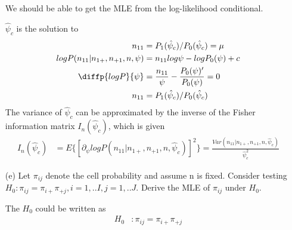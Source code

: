 \documentclass[11pt]{article} %
\begin{document}
\begin{itemize}
We should be able to get the MLE from the log-likelihood conditional.

$\hat{\psi}_c$ is the solution to 
\begin{align*}
	n_{11} &= P_1(\hat{\psi}_c)/P_0(\hat{\psi}_c) = \mu\\
	log P(n_{11}| n_{1+}, n_{+1}, n, \psi) &=  n_{11} log \psi - log P_0(\psi) + c\\
	\diffp{log P}{\psi} &= \frac{n_{11}}{\psi} -\frac{P_0(\psi)'}{P_0(\psi)} = 0\\
	n_{11} &= P_1(\hat{\psi}_c)/P_0(\hat{\psi}_c)
\end{align*}
The variance of $\hat{\psi}_c$ can be approximated by the inverse of the Fisher information matrix $I_n(\hat{\psi}_c)$, which is given
\begin{align*}
	I_n(\hat{\psi}_c) &= E\{[ \partial_{\psi} log P(n_{11}| n_{1+}, n_{+1}, n, \hat{\psi}_c)]^2 \} = \frac{Var(n_{11}| n_{1+}, n_{+1}, n, \hat{\psi}_c)}{\hat{\psi}_c^2}
\end{align*}

\item[(e)] Let $\pi_{ij}$ denote the cell probability and assume n is fixed. Consider testing $H_0: \pi_{ij} = \pi_{i+} \pi_{+j}, i=1,..I, j=1,..J$. Derive the MLE of $\pi_{ij}$ under $H_0$.

The $H_0$ could be written as 
\begin{align*}
	H_0 &: \pi_{ij} = \pi_{i+} \pi_{+j}
\end{align*}


\end{itemize}
\end{document}
